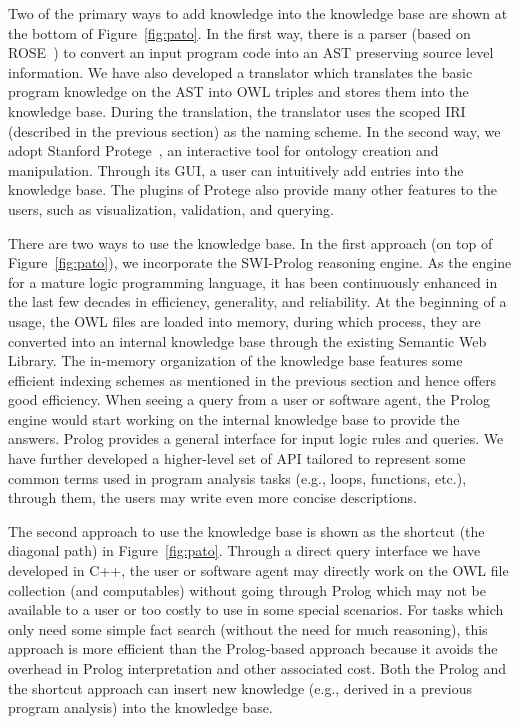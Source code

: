 Two of the primary ways to add knowledge into the knowledge base are
shown at the bottom of Figure~\ref{fig:pato}. In the first way, there
is a parser (based on ROSE~\cite{ROSE}) to convert an input program code into an AST preserving source level information. 
We have also developed a translator
which translates the basic program knowledge on the AST into OWL 
triples and stores them into the knowledge base. During the
translation, the translator uses the scoped IRI (described in the
previous section) as the naming scheme. In the second way, we adopt
Stanford Protege~\cite{gennari2003evolution}, an interactive tool for ontology creation and manipulation.
Through its GUI, a user can intuitively add
entries into the knowledge base. The plugins of Protege
also provide many other features to the users, such as visualization, validation, and querying. 

There are two ways to use the knowledge base. In the first approach
(on top of Figure~\ref{fig:pato}), we incorporate the SWI-Prolog
reasoning engine. As the engine for a mature logic programming
language, it has been continuously enhanced in the last few decades in
efficiency, generality, and reliability. At the beginning of a usage,
the OWL files are loaded into memory, during which process, they are
converted into an internal knowledge base through the existing Semantic
Web Library. The in-memory organization of the
knowledge base features some efficient indexing schemes as mentioned
in the previous section and hence offers good efficiency.  When seeing
a query from a user or software agent, the Prolog engine would start
working on the internal knowledge base to provide the answers.  Prolog
provides a general interface for input logic rules and queries. We
have further developed a higher-level set of API tailored to represent
some common terms used in program analysis tasks (e.g., loops,
functions, etc.), through them, the users may write even more concise
descriptions.

The second approach to use the knowledge base is shown as the shortcut
(the diagonal path) in Figure~\ref{fig:pato}. Through a direct query
interface we have developed in C++, the user or software agent may
directly work on the OWL file collection (and computables) without
going through Prolog which may not be available to a user or too
costly to use in some special scenarios. For tasks which only need
some simple fact search (without the need for much reasoning), this
approach is more efficient than the Prolog-based approach because it
avoids the overhead in Prolog interpretation and other associated
cost.  Both the Prolog and the shortcut approach can insert new
knowledge (e.g., derived in a previous program analysis) into the
knowledge base.

